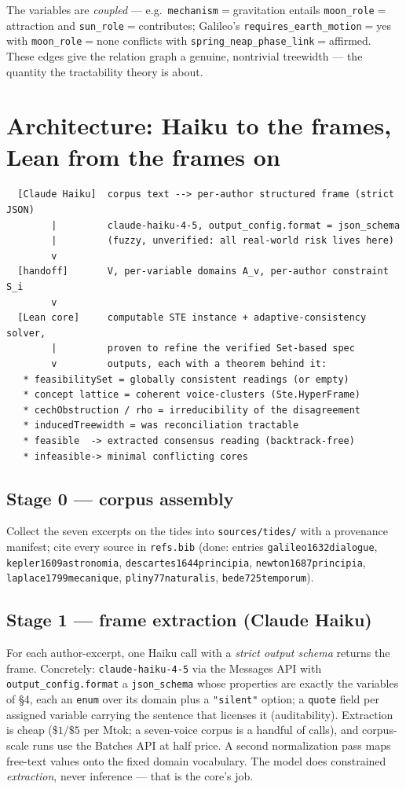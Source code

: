 \documentclass[11pt]{article}
\newcommand{\lean}[1]{\texttt{#1}}
\begin{document}
The variables are \emph{coupled} --- e.g.\ \lean{mechanism}$=$gravitation
entails \lean{moon\_role}$=$attraction and \lean{sun\_role}$=$contributes;
Galileo's \lean{requires\_earth\_motion}$=$yes with \lean{moon\_role}$=$none
conflicts with \lean{spring\_neap\_phase\_link}$=$affirmed. These edges give
the relation graph a genuine, nontrivial treewidth --- the quantity the
tractability theory is about.

\section{Architecture: Haiku to the frames, Lean from the frames on}

\begin{verbatim}
  [Claude Haiku]  corpus text --> per-author structured frame (strict JSON)
        |         claude-haiku-4-5, output_config.format = json_schema
        |         (fuzzy, unverified: all real-world risk lives here)
        v
  [handoff]       V, per-variable domains A_v, per-author constraint S_i
        v
  [Lean core]     computable STE instance + adaptive-consistency solver,
        |         proven to refine the verified Set-based spec
        v         outputs, each with a theorem behind it:
   * feasibilitySet = globally consistent readings (or empty)
   * concept lattice = coherent voice-clusters (Ste.HyperFrame)
   * cechObstruction / rho = irreducibility of the disagreement
   * inducedTreewidth = was reconciliation tractable
   * feasible  -> extracted consensus reading (backtrack-free)
   * infeasible-> minimal conflicting cores
\end{verbatim}

\subsection*{Stage 0 --- corpus assembly}
Collect the seven excerpts on the tides into \lean{sources/tides/} with a
provenance manifest; cite every source in \lean{refs.bib} (done: entries
\lean{galileo1632dialogue}, \lean{kepler1609astronomia},
\lean{descartes1644principia}, \lean{newton1687principia},
\lean{laplace1799mecanique}, \lean{pliny77naturalis},
\lean{bede725temporum}).

\subsection*{Stage 1 --- frame extraction (Claude Haiku)}
For each author-excerpt, one Haiku call with a \emph{strict output schema}
returns the frame. Concretely: \lean{claude-haiku-4-5} via the Messages
API with \lean{output\_config.format} a \lean{json\_schema} whose
properties are exactly the variables of \S4, each an \lean{enum} over its
domain plus a \lean{"silent"} option; a \lean{quote} field per assigned
variable carrying the sentence that licenses it (auditability). Extraction
is cheap ($\$1/\$5$ per Mtok; a seven-voice corpus is a handful of calls),
and corpus-scale runs use the Batches API at half price. A second
normalization pass maps free-text values onto the fixed domain vocabulary.
The model does constrained \emph{extraction}, never inference --- that is
the core's job.
\end{document}
